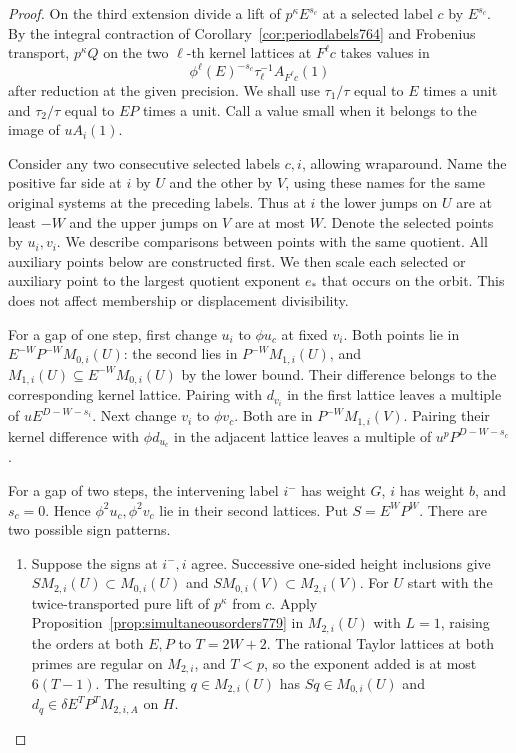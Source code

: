 \documentclass[a4paper,11pt]{article}
\theoremstyle{definition}
\theoremstyle{remark}
\numberwithin{equation}{section}
\begin{document}
\begin{proof}
On the third extension divide a lift of \(p^\kappa E^{s_c}\)
at a selected label \(c\) by \(E^{s_c}\). By the integral
contraction of Corollary~\ref{cor:periodlabels764} and Frobenius
transport, \(p^\kappa Q\) on the two \(\ell\)-th kernel
lattices at \(F^\ell c\) takes values in
\[
       \phi^\ell(E)^{-s_c}\tau_\ell^{-1}A_{F^\ell c}(1)
\]
after reduction at the given precision. We shall use
\(\tau_1/\tau\) equal to \(E\) times a unit and
\(\tau_2/\tau\) equal to \(EP\) times a unit.
Call a value small when it belongs to the image of \(uA_i(1)\).

Consider any two consecutive selected labels \(c,i\), allowing
wraparound. Name the positive far side at \(i\) by \(U\) and
the other by \(V\), using these names for the same original
systems at the preceding labels. Thus at \(i\) the lower jumps
on \(U\) are at least \(-W\) and the upper jumps on \(V\)
are at most \(W\). Denote the selected points by \(u_i,v_i\).
We describe comparisons between points with the same quotient.
All auxiliary points below are constructed first. We then
scale each selected or auxiliary point to the largest quotient
exponent \(e_*\) that occurs on the orbit. This does not affect
membership or displacement divisibility.

For a gap of one step, first change \(u_i\) to \(\phi u_c\)
at fixed \(v_i\). Both points lie in
\(E^{-W}P^{-W}M_{0,i}(U)\): the second lies in
\(P^{-W}M_{1,i}(U)\), and \(M_{1,i}(U)\subseteq
E^{-W}M_{0,i}(U)\) by the lower bound. Their difference
belongs to the corresponding kernel lattice. Pairing with
\(d_{v_i}\) in the first lattice leaves a multiple of
\(uE^{D-W-s_i}\). Next change \(v_i\) to \(\phi v_c\).
Both are in \(P^{-W}M_{1,i}(V)\). Pairing their kernel
difference with \(\phi d_{u_c}\) in the adjacent lattice
leaves a multiple of \(u^p P^{D-W-s_c}\).

For a gap of two steps, the intervening label \(i^-\) has
weight \(G\), \(i\) has weight \(b\), and \(s_c=0\). Hence
\(\phi^2u_c,\phi^2v_c\) lie in their second lattices.
Put \(S=E^W P^W\). There are two possible sign patterns.
\begin{enumerate}
\item Suppose the signs at \(i^-,i\) agree. Successive
one-sided height inclusions give \(S M_{2,i}(U)\subset
M_{0,i}(U)\) and \(S M_{0,i}(V)\subset M_{2,i}(V)\).
For \(U\) start with the twice-transported pure lift of
\(p^\kappa\) from \(c\). Apply Proposition~\ref{prop:simultaneousorders779}
in \(M_{2,i}(U)\) with \(L=1\), raising the orders at both
\(E,P\) to \(T=2W+2\). The rational Taylor lattices at
both primes are regular on \(M_{2,i}\), and \(T<p\), so the
exponent added is at most \(6(T-1)\). The resulting
\(q\in M_{2,i}(U)\) has \(Sq\in M_{0,i}(U)\) and
\(d_q\in\delta E^T P^T M_{2,i,A}\) on \(H\).


\end{enumerate}
\end{proof}
\end{document}
